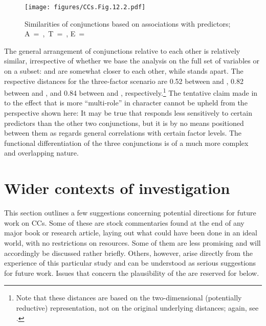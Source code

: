 \begin{figure}
\texttt{[image: figures/CCs.Fig.12.2.pdf]}
\caption{\label{bkm:Ref80963762}\label{fig:12.2}Similarities of conjunctions based on associations with predictors; A~=~,~T~=~, E~=~}
\end{figure}

The general arrangement of conjunctions relative to each other is relatively similar, irrespective of whether we base the analysis on the full set of variables or on a subset:  and  are somewhat closer to each other, while  stands apart. The respective distances for the three-factor scenario are 0.52 between  and , 0.82 between  and , and 0.84 between  and , respectively.\footnote{Note that these distances are based on the two-dimensional (potentially reductive) representation, not on the original underlying distances; again, see \citet{Schützler2022}.} The tentative claim made in  to the effect that  is more “multi-role” in character cannot be upheld from the perspective shown here: It may be true that  responds less sensitively to certain predictors than the other two conjunctions, but it is by no means positioned between them as regards general correlations with certain factor levels. The functional differentiation of the three conjunctions is of a much more complex and overlapping nature.

\section{Wider contexts of investigation}\label{sec:12.2}\label{bkm:Ref82933818}\label{bkm:Ref80005891}\label{bkm:Ref80607069}

This section outlines a few suggestions concerning potential directions for future work on CCs. Some of these are stock commentaries found at the end of any major book or research article, laying out what could have been done in an ideal world, with no restrictions on resources. Some of them are less promising and will accordingly be discussed rather briefly. Others, however, arise directly from the experience of this particular study and can be understood as serious suggestions for future work. Issues that concern the plausibility of the  are reserved for  below.


